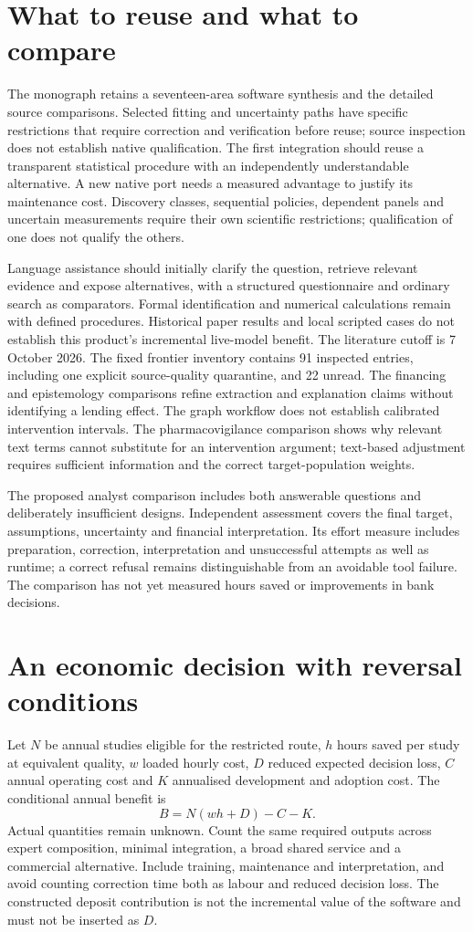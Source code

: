 \section*{What to reuse and what to compare}
The monograph retains a seventeen-area software synthesis and the detailed
source comparisons. Selected fitting and uncertainty paths have specific
restrictions that require correction and verification before reuse; source
inspection does not establish native qualification. The first integration
should reuse a transparent statistical procedure with an independently
understandable alternative.
A new native port needs a measured advantage to justify its maintenance
cost. Discovery classes, sequential policies, dependent panels and uncertain
measurements require their own scientific restrictions; qualification of
one does not qualify the others.

Language assistance should initially clarify the question, retrieve relevant
evidence and expose alternatives, with a structured questionnaire and ordinary
search as comparators. Formal identification and numerical calculations remain
with defined procedures. Historical paper results and local scripted cases
do not establish this product's incremental live-model benefit. The literature
cutoff is 7 October 2026. The fixed frontier inventory contains 91 inspected
entries, including one explicit source-quality quarantine, and 22 unread.
The financing and epistemology comparisons refine extraction and explanation
claims without identifying a lending effect. The graph workflow does not
establish calibrated intervention intervals. The pharmacovigilance comparison
shows why relevant text terms cannot substitute for an intervention argument;
text-based adjustment requires sufficient information and the correct
target-population weights.

The proposed analyst comparison includes both answerable questions and
deliberately insufficient designs. Independent assessment covers the final
target, assumptions, uncertainty and financial interpretation. Its effort
measure includes preparation, correction, interpretation and unsuccessful
attempts as well as runtime; a correct refusal remains distinguishable from
an avoidable tool failure. The comparison has not yet measured hours saved
or improvements in bank decisions.

\section*{An economic decision with reversal conditions}
Let $N$ be annual studies eligible for the restricted route, $h$ hours saved
per study at equivalent quality, $w$ loaded hourly cost, $D$ reduced expected
decision loss, $C$ annual operating cost and $K$ annualised development and
adoption cost. The conditional annual benefit is
\[ B=N(wh+D)-C-K. \]
Actual quantities remain unknown. Count the same required outputs across
expert composition, minimal integration, a broad shared service and a
commercial alternative. Include training, maintenance and interpretation,
and avoid counting correction time both as labour and reduced decision loss.
The constructed deposit contribution is not the incremental value of the
software and must not be inserted as $D$.

